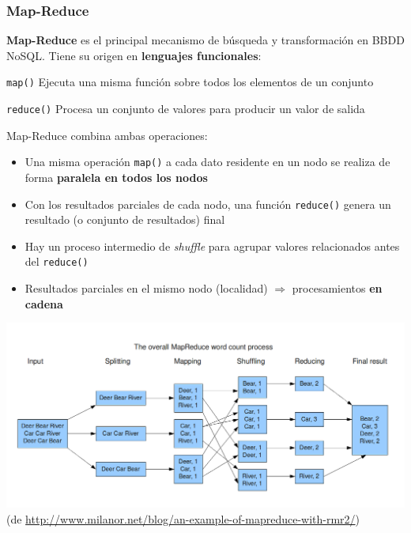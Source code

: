 \documentclass[14pt]{beamer}
\begin{document}
\begin{frame}
\frametitle{Map-Reduce}

 {\bf Map-Reduce} es el principal mecanismo de búsqueda y transformación en
 BBDD NoSQL. Tiene su origen en {\bf lenguajes funcionales}:
  \begin{block}{{\tt map()}}
    Ejecuta una misma función sobre todos los elementos de un conjunto
  \end{block}
  \begin{block}{{\tt reduce()}}
    Procesa un conjunto de valores para producir un valor de salida
  \end{block}

\framebreak

Map-Reduce combina ambas operaciones:
\begin{itemize}
\item Una misma operación {\tt map()} a cada dato residente en un nodo se
  realiza de forma {\bf paralela en todos los nodos}
\item Con los resultados parciales de cada nodo, una función {\tt reduce()}
  genera un resultado (o conjunto de resultados) final
\item Hay un proceso intermedio de {\em shuffle} para agrupar valores
  relacionados antes del {\tt reduce()}
\item Resultados parciales en el mismo nodo (localidad) $\Rightarrow$
  procesamientos {\bf en cadena}
\end{itemize}

\framebreak

\centering\includegraphics[width=\textwidth]{img/MapReduceWordcount}
(de \url{http://www.milanor.net/blog/an-example-of-mapreduce-with-rmr2/})
\end{frame}
\end{document}
